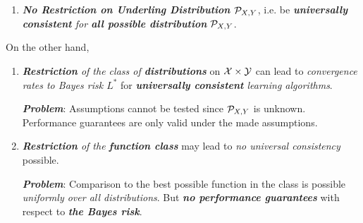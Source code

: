 \documentclass[11pt]{article}
\begin{document}
\begin{itemize}
\begin{remark}
\begin{enumerate}
\item \emph{\textbf{No Restriction on Underling Distribution ${\mathcal P}_{X, Y}$}}, i.e. be \emph{\textbf{universally consistent} for \textbf{all possible distribution} ${\mathcal P}_{X, Y}$}.
\end{enumerate}
On the other hand, 
\begin{enumerate}
\item \emph{\textbf{Restriction} of the class of \textbf{distributions}} on ${\mathcal X} \times {\mathcal Y}$ can lead to \emph{convergence rates to Bayes risk $L^{*}$} for \emph{\textbf{universally consistent} learning algorithms}.

\emph{\textbf{Problem}}: Assumptions cannot be tested since ${\mathcal P}_{X, Y}$ is unknown. Performance guarantees are only valid under the made assumptions.

\item \emph{\textbf{Restriction} of the \textbf{function class}} may lead to \emph{no universal consistency} possible.

\emph{\textbf{Problem}}:  Comparison to the best possible function in the class is possible \emph{uniformly over all distributions}. But \emph{\textbf{no performance guarantees}} with respect to \emph{\textbf{the Bayes risk}}.
\end{enumerate}
\end{remark}
\end{itemize}
\end{document}
